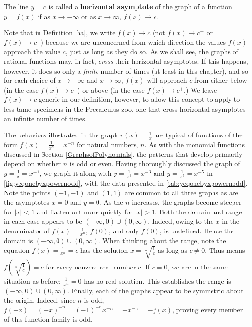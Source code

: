 \begin{mdefn} \label{ha} The line $y=c$ is called a \textbf{horizontal asymptote} of the graph of a function $y=f(x)$ if as $x \rightarrow -\infty$ or as $x \rightarrow \infty$, $f(x) \rightarrow c$.

\end{mdefn}

Note that in Definition \ref{ha}, we write $f(x) \rightarrow c$ (not $f(x) \rightarrow c^{+}$ or $f(x) \rightarrow c^{-}$) because we are unconcerned from which direction the values $f(x)$ approach the value $c$, just as long as they do so.  As we shall see, the graphs of rational functions may, in fact, \textit{cross} their horizontal asymptotes.  If this happens, however,  it does so only a \textit{finite} number of times (at least in this chapter), and so for each choice of $x \rightarrow -\infty$ and $x \rightarrow \infty$, $f(x)$ will approach $c$ from either below (in the case $f(x) \rightarrow c^{-}$) or above (in the case $f(x) \rightarrow c^{+}$.)  We leave $f(x) \rightarrow c$ generic in our definition, however, to allow this concept to apply to less tame specimens in the Precalculus zoo, one that cross horizontal asymptotes an infinite number of times.

The behaviors illustrated in the graph $r(x) = \frac{1}{x}$ are typical of functions of the form $f(x) = \frac{1}{x^n} = x^{-n}$ for natural numbers, $n$.  As with the monomial functions discussed in Section \ref{GraphsofPolynomials}, the patterns that develop primarily depend on whether $n$ is odd or even.  Having thoroughly discussed the graph of $y = \frac{1}{x} = x^{-1}$, we graph it along with $y = \frac{1}{x^3} = x^{-3}$ and $y = \frac{1}{x^5} = x^{-5}$ in \autoref{fig:yeqonebyxpowernodd}, with the data presented in \autoref{tab:yeqonebyxpowernodd}.  Note the points $(-1,-1)$ and $(1,1)$ are common to all three graphs as are the asymptotes $x = 0$ and $y = 0$.  As the $n$ increases, the graphs become steeper for $|x| < 1$  and flatten out more quickly for $|x|>1$.  Both the domain and range in each case appears to be $(-\infty, 0) \cup (0, \infty)$.  Indeed, owing to the $x$ in the denominator of $f(x) = \frac{1}{x^n}$, $f(0)$, and only $f(0)$,  is undefined. Hence the domain is $(-\infty, 0) \cup (0, \infty)$.  When thinking about the range, note the equation  $f(x)= \frac{1}{x^n}  = c$ has the solution $x = \sqrt[n]{\frac{1}{c}}$ as long as $c \neq 0$.  Thus means $f\left( \sqrt[n]{\frac{1}{c}} \right) = c$ for every nonzero real number $c$.  If $c = 0$, we are in the same situation as before:  $\frac{1}{x^n} = 0$ has no real solution.  This establishes the range is $(-\infty, 0) \cup (0, \infty)$.  Finally, each of the graphs appear to be symmetric about the origin.  Indeed, since $n$ is odd, $f(-x) = (-x)^{-n} = (-1)^{-n} x^{-n} = -x^{-n} = -f(x)$, proving every member of this function family is odd.  

